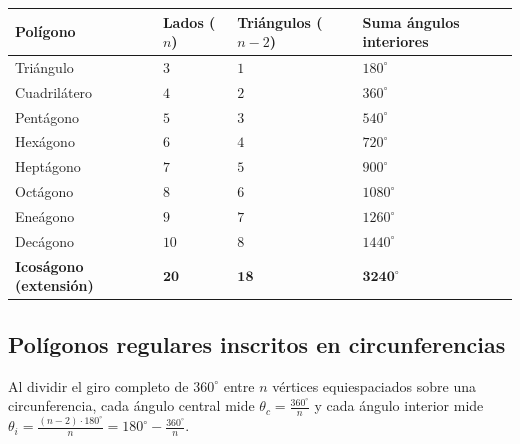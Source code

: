 \documentclass[spanish,letterpaper,oneside]{article}
\begin{document}
{\small{}\renewcommand{\arraystretch}{1.16}
\noindent\begin{tabularx}{\textwidth}{|>{\raggedright\arraybackslash}X|>{\centering\arraybackslash}p{}|>{\centering\arraybackslash}p{}|>{\centering\arraybackslash}p{}|}\hline
\rowcolor{iiiepePale} \textbf{Polígono} & \textbf{Lados ($n$)} & \textbf{Triángulos ($n-2$)} & \textbf{Suma ángulos interiores} \\\hline
Triángulo & $3$ & $1$ & $180^\circ$ \\\hline
Cuadrilátero & $4$ & $2$ & $360^\circ$ \\\hline
Pentágono & $5$ & $3$ & $540^\circ$ \\\hline
Hexágono & $6$ & $4$ & $720^\circ$ \\\hline
Heptágono & $7$ & $5$ & $900^\circ$ \\\hline
Octágono & $8$ & $6$ & $1080^\circ$ \\\hline
Eneágono & $9$ & $7$ & $1260^\circ$ \\\hline
Decágono & $10$ & $8$ & $1440^\circ$ \\\hline
\textbf{Icoságono (extensión)} & $\mathbf{20}$ & $\mathbf{18}$ & $\mathbf{3240^\circ}$ \\\hline
\end{tabularx}}
\vspace{4pt}

\subsection{Polígonos regulares inscritos en circunferencias}
Al dividir el giro completo de $360^\circ$ entre $n$ vértices equiespaciados sobre una circunferencia, cada ángulo central mide $\theta_c = \frac{360^\circ}{n}$ y cada ángulo interior mide $\theta_i = \frac{(n-2)\cdot 180^\circ}{n} = 180^\circ - \frac{360^\circ}{n}$.
\end{document}
